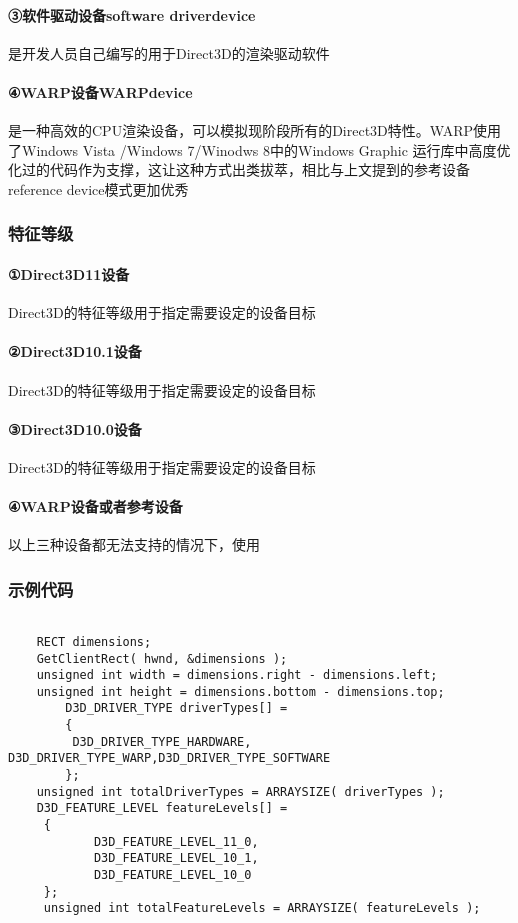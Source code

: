 \documentclass[UTF8,a4paper,8pt]{ctexart}
\begin{document}
			\paragraph{③软件驱动设备software driverdevice}是开发人员自己编写的用于Direct3D的渲染驱动软件
	   
			\paragraph{④WARP设备WARPdevice}是一种高效的CPU渲染设备，可以模拟现阶段所有的Direct3D特性。WARP使用了Windows Vista /Windows 7/Winodws 8中的Windows Graphic 运行库中高度优化过的代码作为支撑，这让这种方式出类拔萃，相比与上文提到的参考设备reference device模式更加优秀
   
		\subsubsection*{特征等级}
   
			\paragraph{①Direct3D11设备}Direct3D的特征等级用于指定需要设定的设备目标
	   
			\paragraph{②Direct3D10.1设备}Direct3D的特征等级用于指定需要设定的设备目标
	   
			\paragraph{③Direct3D10.0设备}Direct3D的特征等级用于指定需要设定的设备目标
	   
			\paragraph{④WARP设备或者参考设备}以上三种设备都无法支持的情况下，使用
   
		\subsubsection*{示例代码}
      
	      \begin{lstlisting}[language={[ANSI]C++}]
      
	RECT dimensions;
	GetClientRect( hwnd, &dimensions );
	unsigned int width = dimensions.right - dimensions.left;
	unsigned int height = dimensions.bottom - dimensions.top;
        D3D_DRIVER_TYPE driverTypes[] =
        {
         D3D_DRIVER_TYPE_HARDWARE, D3D_DRIVER_TYPE_WARP,D3D_DRIVER_TYPE_SOFTWARE
        };
	unsigned int totalDriverTypes = ARRAYSIZE( driverTypes );
	D3D_FEATURE_LEVEL featureLevels[] =
	 {
	        D3D_FEATURE_LEVEL_11_0,
	        D3D_FEATURE_LEVEL_10_1,
	        D3D_FEATURE_LEVEL_10_0
	 };
	 unsigned int totalFeatureLevels = ARRAYSIZE( featureLevels );
      
	      \end{lstlisting}
 \newpage
\end{document}
